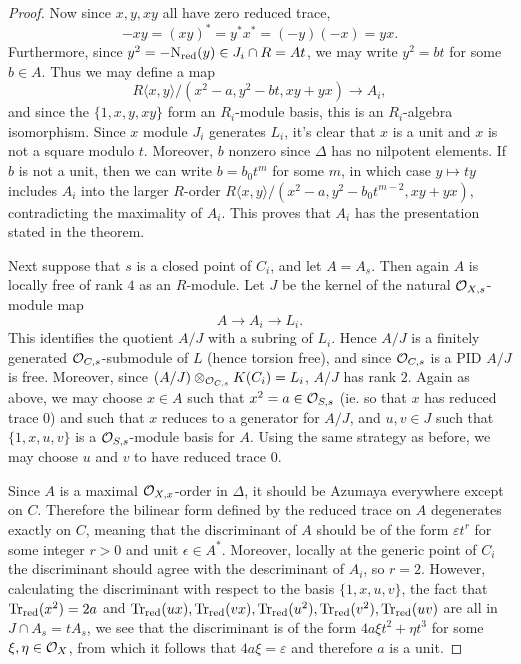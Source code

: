 \begin{proof}
Now since $x,y,xy$ all have zero reduced trace,
$$-xy = (xy)^* = y^*x^* = (-y)(-x) = yx.$$
Furthermore, since $y^2 = -\textnormal{N}_{\text{red}}(y)\in J_i\cap R = At$, we may write $y^2 = bt$ for some $b\in A$.  Thus we may define a map
$$R\langle x,y\rangle/(x^2-a,y^2-bt,xy+yx)\rightarrow A_i,$$
and since the $\{1,x,y,xy\}$ form an $R_i$-module basis, this is an $R_i$-algebra isomorphism.  Since $x$ module $J_i$ generates $L_i$, it's clear that $x$ is a unit and $x$ is not a square modulo $t$.  Moreover, $b$ nonzero since $\Delta$ has no nilpotent elements.  If $b$ is not a unit, then we can write $b = b_0t^m$ for some $m$, in which case $y\mapsto ty$ includes $A_i$ into the larger $R$-order $R\langle x,y\rangle/(x^2-a,y^2-b_0t^{m-2},xy+yx)$, contradicting the maximality of $A_i$.  This proves that $A_i$ has the presentation stated in the theorem.

Next suppose that $s$ is a closed point of $C_i$, and let $A = A_s$.  Then again $A$ is locally free of rank $4$ as an $R$-module.  Let $J$ be the kernel of the natural $\mathcal{O}_{X,s}$-module map
$$A\rightarrow A_i\rightarrow L_i.$$
This identifies the quotient $A/J$ with a subring of $L_i$.  Hence $A/J$ is a finitely generated $\mathcal{O}_{C,s}$-submodule of $L$ (hence torsion free), and since $\mathcal{O}_{C,s}$ is a PID $A/J$ is free.  Moreover, since $(A/J)\otimes_{\mathcal{O}_{C,s}} K(C_i) = L_i$, $A/J$ has rank $2$.  Again as above, we may choose $x\in A$ such that $x^2 = a\in\mathcal{O}_{S,s}$ (ie. so that $x$ has reduced trace $0$) and such that $x$ reduces to a generator for $A/J$, and $u,v\in J$ such that $\{1,x,u,v\}$ is a $\mathcal{O}_{S,s}$-module basis for $A$.  Using the same strategy as before, we may choose $u$ and $v$ to have reduced trace $0$.

Since $A$ is a maximal $\mathcal{O}_{X,x}$-order in $\Delta$, it should be Azumaya everywhere except on $C$.  Therefore the bilinear form defined by the reduced trace on $A$ degenerates exactly on $C$, meaning that the discriminant of $A$ should be of the form $\varepsilon t^r$ for some integer $r>0$ and unit $\epsilon\in A^*$.  Moreover, locally at the generic point of $C_i$ the discriminant should agree with the descriminant of $A_i$, so $r=2$. However, calculating the discriminant with respect to the basis $\{1,x,u,v\}$, the fact that $\textnormal{Tr}_{\text{red}}(x^2) = 2a$ and $\textnormal{Tr}_{\text{red}}(ux),\textnormal{Tr}_{\text{red}}(vx),\textnormal{Tr}_{\text{red}}(u^2),\textnormal{Tr}_{\text{red}}(v^2),\textnormal{Tr}_{\text{red}}(uv)$ are all in $J\cap A_s = tA_s$, we see that the discriminant is of the form $4a\xi t^2 + \eta t^3$ for some $\xi,\eta\in \mathcal{O}_X$, from which it follows that $4a\xi = \varepsilon$ and therefore $a$ is a unit.


\end{proof}

